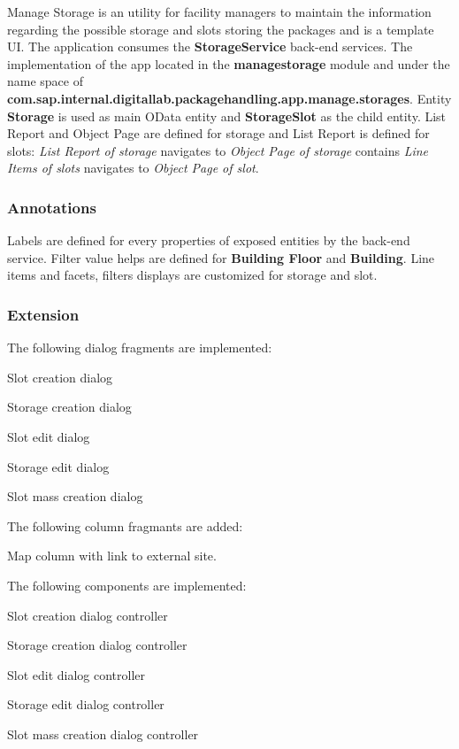 Manage Storage is an utility for facility managers to maintain the information regarding the possible storage and slots storing the packages and is a template UI.
The application consumes the \textbf{StorageService} back-end services.
The implementation of the app
located in the \textbf{managestorage} module and under the name space of
\textbf{com.sap.internal.digitallab.packagehandling.app.manage.storages}.
Entity \textbf{Storage} is used as main OData entity and \textbf{StorageSlot} as the child entity.
List Report and Object Page are defined for storage and List Report is defined for slots: \textit{List Report of storage} navigates to \textit{Object Page of storage} contains \textit{Line Items of 
slots} navigates to \textit{Object Page of slot}.

\subsubsection{Annotations}
Labels are defined for every properties of exposed entities by the back-end service. Filter value helps are defined for \textbf{Building Floor} and \textbf{Building}.
Line items and facets, filters displays are customized for storage and slot.

\subsubsection{Extension}

The following dialog fragments are implemented:
\begin{compactenum}
    \item Slot creation dialog
    \item Storage creation dialog
    \item Slot edit dialog
    \item Storage edit dialog
    \item Slot mass creation dialog
\end{compactenum}

\bigskip
The following column fragmants are added:
\begin{compactenum}
    \item Map column with link to external site.
\end{compactenum}

\bigskip
The following components are implemented:
\begin{compactenum}
    \item Slot creation dialog controller
    \item Storage creation dialog controller
    \item Slot edit dialog controller
    \item Storage edit dialog controller
    \item Slot mass creation dialog controller
\end{compactenum}

